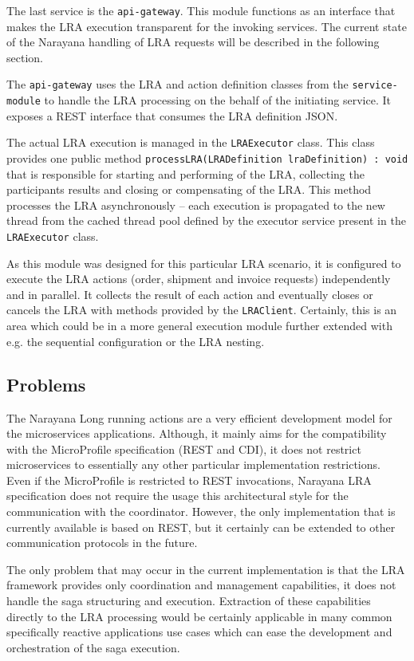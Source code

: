 \documentclass[oneside,
  digital, %
  table,   %
  nolof,     %
  nolot,     %
]{fithesis3}
\begin{document}
The last service is the \texttt{api-gateway}. This module functions as an interface that makes the LRA execution transparent for the invoking services. The current state of the Narayana handling of LRA requests will be described in the following section.

The \texttt{api-gateway} uses the LRA and action definition classes from the \texttt{service-module} to handle the LRA processing on the behalf of the initiating service. It exposes a REST interface that consumes the LRA definition JSON.

The actual LRA execution is managed in the \texttt{LRAExecutor} class. This class provides one public method \texttt{processLRA(LRADefinition lraDefinition) : void} that is responsible for starting and performing of the LRA, collecting the participants results and closing or compensating of the LRA. This method processes the LRA asynchronously -- each execution is propagated to the new thread from the cached thread pool defined by the executor service present in the \texttt{LRAExecutor} class.

As this module was designed for this particular LRA scenario, it is configured to execute the LRA actions (order, shipment and invoice requests) independently and in parallel. It collects the result of each action and eventually closes or cancels the LRA with methods provided by the \texttt{LRAClient}. Certainly, this is an area which could be in a more general execution module further extended with e.g. the sequential configuration or the LRA nesting.

\subsection{Problems}

The Narayana Long running actions are a very efficient development model for the microservices applications. Although, it mainly aims for the compatibility with the MicroProfile specification (REST and CDI), it does not restrict microservices to essentially any other particular implementation restrictions. Even if the MicroProfile is restricted to REST invocations, Narayana LRA specification does not require the usage this architectural style for the communication with the coordinator. However, the only implementation that is currently available is based on REST, but it certainly can be extended to other communication protocols in the future.

The only problem that may occur in the current implementation is that the LRA framework provides only coordination and management capabilities, it does not handle the saga structuring and execution. Extraction of these capabilities directly to the LRA processing would be certainly applicable in many common specifically reactive applications use cases which can ease the development and orchestration of the saga execution. 
\end{document}
